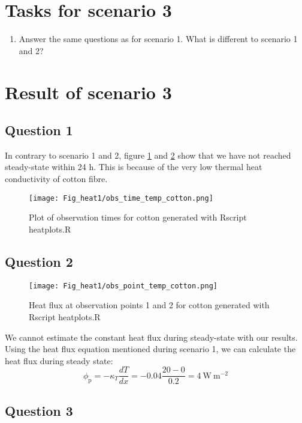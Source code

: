 \section*{Tasks for scenario 3}

\begin{enumerate}
\item Answer the same questions as for scenario 1. What is different to scenario 1 and 2?
\end{enumerate}

\section*{Result of scenario 3}
\subsection*{Question 1}
In contrary to scenario 1 and 2, figure \ref{plot7} and \ref{plot8} show that we have not reached steady-state within 24 h. This is because of the very low thermal heat conductivity of cotton fibre. 

\begin{figure}[!h]
\centering
\texttt{[image: Fig\_heat1/obs\_time\_temp\_cotton.png]}
\caption{\label{plot7}Plot of observation times for cotton generated with Rscript heatplots.R}
\end{figure}

\subsection*{Question 2}

\begin{figure}[!h]
\centering
\texttt{[image: Fig\_heat1/obs\_point\_temp\_cotton.png]}
\caption{\label{plot8} Heat flux at observation points 1 and 2 for cotton generated with Rscript heatplots.R}
\end{figure}

We cannot estimate the constant heat flux during steady-state with our results. Using the heat flux equation mentioned during scenario 1, we can calculate the heat flux during steady state:
\begin{equation*}
\phi_{\mathrm{p}}=-\kappa_T \frac{dT}{dx}= -0.04 \frac{20-0}{0.2}= 4 \mathrm{~W~m^{-2}}
\end{equation*}

\subsection*{Question 3}

